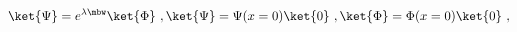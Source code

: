 \begin{equation}\label{flu}
\ket{\Psi}=e^{\lambda\mbw}\ket{\Phi} \ , 
\ket{\Psi}=\Psi(x=0)\ket{0} \ ,
\ket{\Phi}=\Phi(x=0)\ket{0} \ ,
\end{equation}

